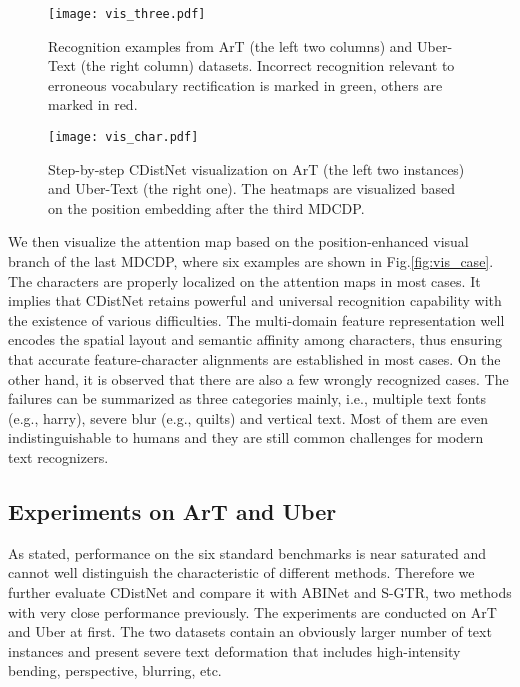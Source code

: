 \begin{figure*}[]
\centering
\texttt{[image: vis\_three.pdf]} \caption{Recognition examples from ArT (the left two columns) and Uber-Text (the right column) datasets. Incorrect recognition relevant to erroneous vocabulary rectification is marked in green, others are marked in red.}
\label{vis_art}
\end{figure*}

\begin{figure*}[]
\centering
\texttt{[image: vis\_char.pdf]} \caption{Step-by-step CDistNet visualization on ArT (the left two instances) and Uber-Text (the right one). The heatmaps are visualized based on the position embedding after the third MDCDP.}
\label{vis_char}
\end{figure*}

We then visualize the attention map based on the position-enhanced visual branch of the last MDCDP, where six examples are shown in Fig.\ref{fig:vis_case}. The characters are properly localized on the attention maps in most cases. It implies that CDistNet retains powerful and universal recognition capability with the existence of various difficulties. The multi-domain feature representation well encodes the spatial layout and semantic affinity among characters, thus ensuring that accurate feature-character alignments are established in most cases. On the other hand, it is observed that there are also a few wrongly recognized cases. The failures can be summarized as three categories mainly, i.e., multiple text fonts (e.g., harry), severe blur (e.g., quilts) and vertical text. Most of them are even indistinguishable to humans and they are still common challenges for modern text recognizers.




\subsection{Experiments on ArT and Uber}
As stated, performance on the six standard benchmarks is near saturated and cannot well distinguish the characteristic of different methods. Therefore we further evaluate CDistNet and compare it with ABINet and S-GTR, two methods with very close performance previously. The experiments are conducted on ArT and Uber at first. The two datasets contain an obviously larger number of text instances and present severe text deformation that includes high-intensity bending, perspective, blurring, etc.

